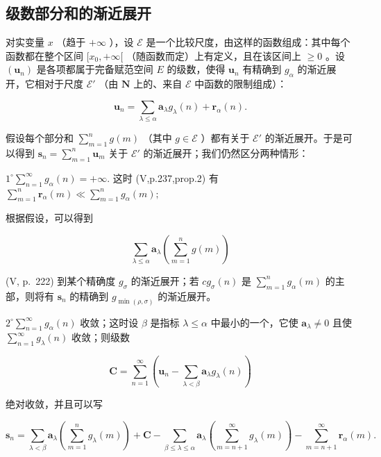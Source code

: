 \subsection{级数部分和的渐近展开}

对实变量 \(x\) （趋于 \(+\infty\) ），设 \(\mathcal{E}\) 是一个比较尺度，由这样的函数组成：其中每个函数都在整个区间 \([x_0, +\infty[\) （随函数而定）上有定义，且在该区间上 \(\geqslant 0\) 。设 \((\mathbf{u}_n)\) 是各项都属于完备赋范空间 \(E\) 的级数，使得 \(\mathbf{u}_n\) 有精确到 \(g_\alpha\) 的渐近展开，它相对于尺度 \(\mathcal{E}'\) （由 \(\mathbf{N}\) 上的、来自 \(\mathcal{E}\) 中函数的限制组成）：

\[
\mathbf {u} _ {n} = \sum_ {\lambda \leqslant \alpha} \mathbf {a} _ {\lambda} g _ {\lambda} (n) + \mathbf {r} _ {\alpha} (n).
\]

假设每个部分和 \(\sum_{m=1}^{n} g(m)\) （其中 \(g \in \mathcal{E}\) ）都有关于 \(\mathcal{E}'\) 的渐近展开。于是可以得到 \(\mathbf{s}_n = \sum_{m=1}^{n} \mathbf{u}_m\) 关于 \(\mathcal{E}'\) 的渐近展开；我们仍然区分两种情形：

\(1^{\circ}\sum_{n = 1}^{\infty}g_{\alpha}(n) = +\infty .\) 这时 (V,p.237,prop.2) 有 \(\sum_{m = 1}^{n}\mathbf{r}_{\alpha}(m)\ll \sum_{m = 1}^{n}g_{\alpha}(m);\)

根据假设，可以得到

\[
\sum_ {\lambda \leqslant \alpha} \mathbf {a} _ {\lambda} \left(\sum_ {m = 1} ^ {n} g (m)\right)
\]

(V, p.~222) 到某个精确度 \(g_{\sigma}\) 的渐近展开；若 \(cg_{\sigma}(n)\) 是 \(\sum_{m=1}^{n} g_{\alpha}(m)\) 的主部，则将有 \(\mathbf{s}_n\) 的精确到 \(g_{\min(\rho, \sigma)}\) 的渐近展开。

\(2^{\circ}\sum_{n = 1}^{\infty}g_{\alpha}(n)\) 收敛；这时设 \(\beta\) 是指标 \(\lambda \leqslant \alpha\) 中最小的一个，它使 \(\mathbf{a}_{\lambda}\neq 0\) 且使 \(\sum_{n = 1}^{\infty}g_{\lambda}(n)\) 收敛；则级数

\[
\mathbf {C} = \sum_ {n = 1} ^ {\infty} \left(\mathbf {u} _ {n} - \sum_ {\lambda <   \beta} \mathbf {a} _ {\lambda} g _ {\lambda} (n)\right)
\]

绝对收敛，并且可以写

\[
\mathbf {s} _ {n} = \sum_ {\lambda <   \beta} \mathbf {a} _ {\lambda} \left(\sum_ {m = 1} ^ {n} g _ {\lambda} (m)\right) + \mathbf {C} - \sum_ {\beta \leqslant \lambda \leqslant \alpha} \mathbf {a} _ {\lambda} \left(\sum_ {m = n + 1} ^ {\infty} g _ {\lambda} (m)\right) - \sum_ {m = n + 1} ^ {\infty} \mathbf {r} _ {\alpha} (m).
\]

